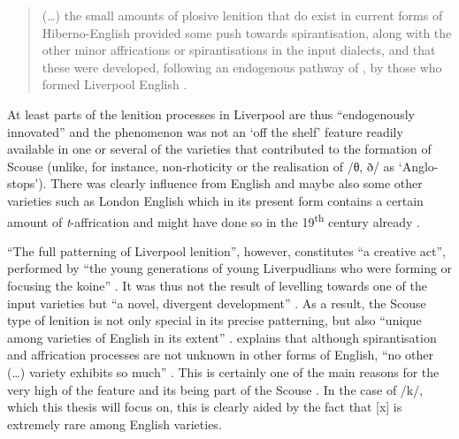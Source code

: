	\begin{quote}
		(\ldots) the small amounts of plosive lenition that do exist in current forms of Hiberno-English provided some push towards spirantisation, along with the other minor affrications or spirantisations in the input dialects, and that these were developed, following an endogenous pathway of , by those who formed Liverpool English \citeyearpar[131]{honeybone2007}.
	\end{quote}

At least parts of the lenition processes in Liverpool are thus ``endogenously innovated'' \citep[130]{honeybone2007} and the phenomenon was not an `off the shelf' feature readily available in one or several of the varieties that contributed to the formation of Scouse (unlike, for instance, non-rhoticity or the realisation of /θ, ð/ as `Anglo- stops').
There was clearly influence from  English and maybe also some other varieties such as London English which in its present form contains a certain amount of \emph{t}-affrication and might have done so in the 19\textsuperscript{th} century already \parencite[cf.][132]{honeybone2007}.

``The full patterning of Liverpool lenition'', however, constitutes ``a creative act'', performed by ``the young generations of young Liverpudlians who were forming or focusing the koine'' \parencite[132]{honeybone2007}.
It was thus not the result of levelling towards one of the input varieties but ``a novel, divergent development'' \parencite[132]{honeybone2007}.
As a result, the Scouse type of lenition is not only special in its precise patterning, but also ``unique among varieties of English in its extent'' \parencite[132]{honeybone2007}.
\textcite[130]{honeybone2007} explains that although spirantisation and affrication processes are not unknown in other forms of English, ``no other (\ldots) variety exhibits so much'' \parencite[130]{honeybone2007}.
This is certainly one of the main reasons for the very high  of the feature and its being part of the Scouse .
In the case of /k/, which this thesis will focus on, this is clearly aided by the fact that [x] is extremely rare among English varieties.

